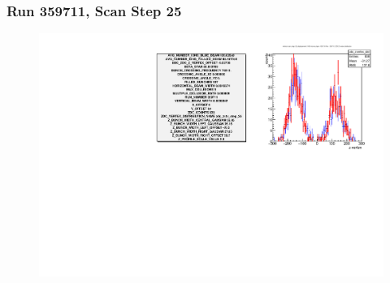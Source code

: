 \begin{frame}
\frametitle{Run 359711, Scan Step 25}
\begin{figure}
\begin{center}
\includegraphics[width=\linewidth]{"figs/359711_step_25_zdc_zvertex"}
\caption{ }
\label{fig:359711_step_25_zdc_zvertex}
\end{center}\end{figure}
\end{frame}

